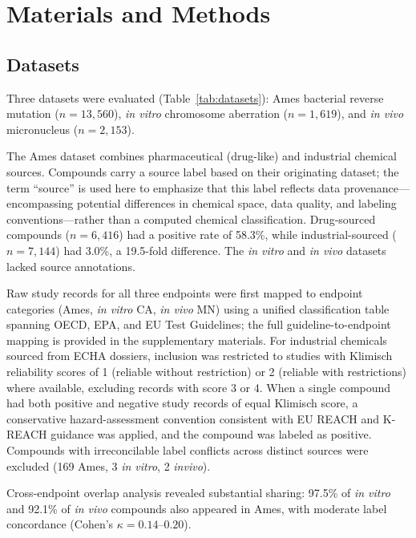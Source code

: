 \section{Materials and Methods}

\subsection{Datasets}

Three datasets were evaluated (Table~\ref{tab:datasets}): Ames bacterial reverse mutation 
($n = 13{,}560$), \textit{in vitro} chromosome aberration ($n = 1{,}619$), and \textit{in vivo} micronucleus 
($n = 2{,}153$).

The Ames dataset combines pharmaceutical (drug-like) and industrial chemical sources. 
Compounds carry a source label based on their originating dataset; the term ``source'' is 
used here to emphasize that this label reflects data provenance---encompassing potential 
differences in chemical space, data quality, and labeling conventions---rather than a 
computed chemical classification. Drug-sourced compounds ($n = 6{,}416$) had a positive 
rate of 58.3\%, while industrial-sourced ($n = 7{,}144$) had 3.0\%, a 19.5-fold difference. 
The \textit{in vitro} and \textit{in vivo} datasets lacked source annotations.

Raw study records for all three endpoints were first mapped to endpoint categories (Ames, 
\textit{in vitro} CA, \textit{in vivo} MN) using a unified classification table spanning OECD, EPA, and EU 
Test Guidelines; the full guideline-to-endpoint mapping is provided in the supplementary 
materials. For industrial chemicals sourced from ECHA dossiers, inclusion was restricted to 
studies with Klimisch reliability scores of 1 (reliable without restriction) or 2 (reliable 
with restrictions) where available,\cite{Klimisch_1997} excluding records with score 3 or 4. 
When a single compound had both positive and negative study records of equal Klimisch score, 
a conservative hazard-assessment convention consistent with EU REACH and K-REACH 
guidance\cite{EU_REACH_2006,K_REACH_2018} was applied, and the compound was labeled as 
positive. Compounds with irreconcilable label conflicts across distinct sources were excluded 
(169 Ames, 3 \textit{in vitro}, 2 \textit{invivo}).

Cross-endpoint overlap analysis revealed substantial sharing: 97.5\% of \textit{in vitro} and 92.1\% 
of \textit{in vivo} compounds also appeared in Ames, with moderate label concordance 
(Cohen's $\kappa = 0.14$--$0.20$).

